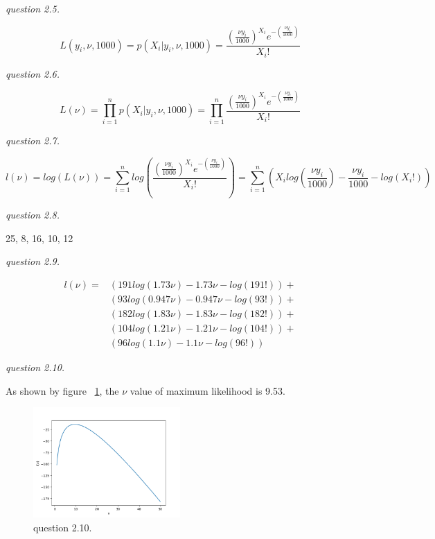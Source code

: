 \documentclass{article}
\begin{document}
\vspace{\baselineskip}
\textit{question 2.5.}

$$L(y_i,\nu,1000)=p(X_i|y_i,\nu,1000)=\frac{{(\frac{\nu y_i}{1000})}^{X_i}e^{-(\frac{\nu y_i}{1000})}}{X_i!}$$

\vspace{\baselineskip}
\textit{question 2.6.}

$$L(\nu)=\prod_{i=1}^np(X_i|y_i,\nu,1000)=\prod_{i=1}^n\frac{{(\frac{\nu y_i}{1000})}^{X_i}e^{-(\frac{\nu y_i}{1000})}}{X_i!}$$

\vspace{\baselineskip}
\textit{question 2.7.}

$$l(\nu)=log(L(\nu))=\sum_{i=1}^nlog(\frac{{(\frac{\nu y_i}{1000})}^{X_i}e^{-(\frac{\nu y_i}{1000})}}{X_i!})=
\sum_{i=1}^n(X_ilog(\frac{\nu y_i}{1000}) - \frac{\nu y_i}{1000} - log(X_i!))$$

\vspace{\baselineskip}
\textit{question 2.8.}

25, 8, 16, 10, 12

\vspace{\baselineskip}
\textit{question 2.9.}

\begin{align*}
    l(\nu)=
    &(191log(1.73\nu) - 1.73\nu - log(191!)) +\\
    &(93log(0.947\nu) - 0.947\nu - log(93!)) +\\
    &(182log(1.83\nu) - 1.83\nu - log(182!)) +\\
    &(104log(1.21\nu) - 1.21\nu - log(104!)) +\\
    &(96log(1.1\nu) - 1.1\nu - log(96!))   
\end{align*}




\vspace{\baselineskip}
\textit{question 2.10.}

As shown by figure ~\ref{fig:2-10}, the $\nu $ value of maximum likelihood is 9.53.

\begin{figure}[H]
    \centering
    \includegraphics[width=0.5\textwidth]{2-10}
    \caption{question 2.10.}
    \label{fig:2-10}
\end{figure}
\end{document}
